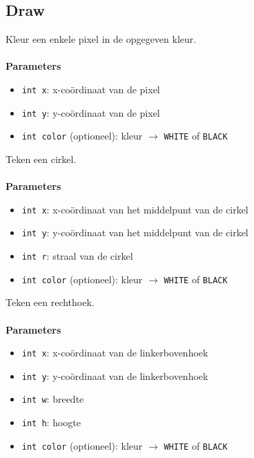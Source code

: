 \documentclass[11pt,fleqn]{book} %
\begin{document}
\subsection{Draw}

\begin{libf}[drawPixel(x, y, \emph{color=WHITE})]
	Kleur een enkele pixel in de opgegeven kleur.\\ \\
	\textbf{Parameters}
	\begin{itemize}
		\item \texttt{int x}: x-coördinaat van de pixel
		\item \texttt{int y}: y-coördinaat van de pixel
		\item \texttt{int color} (optioneel): kleur $\rightarrow$ \texttt{WHITE} of \texttt{BLACK}
	\end{itemize}
\end{libf}

\begin{libf}[drawCircle(x, y, r, \emph{color=WHITE})]
	Teken een cirkel.\\ \\
	\textbf{Parameters}
	\begin{itemize}
		\item \texttt{int x}: x-coördinaat van het middelpunt van de cirkel
		\item \texttt{int y}: y-coördinaat van het middelpunt van de cirkel
		\item \texttt{int r}: straal van de cirkel
		\item \texttt{int color} (optioneel): kleur $\rightarrow$ \texttt{WHITE} of \texttt{BLACK}
	\end{itemize}
\end{libf}

\begin{libf}[drawRect(x, y, w, h, \emph{color=WHITE})]
	Teken een rechthoek.\\ \\
	\textbf{Parameters}
	\begin{itemize}
		\item \texttt{int x}: x-coördinaat van de linkerbovenhoek
		\item \texttt{int y}: y-coördinaat van de linkerbovenhoek
		\item \texttt{int w}: breedte
		\item \texttt{int h}: hoogte
		\item \texttt{int color} (optioneel): kleur $\rightarrow$ \texttt{WHITE} of \texttt{BLACK}
	\end{itemize}
\end{libf}
\end{document}
